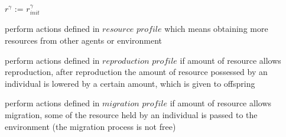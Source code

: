 \begin{algorithmic}

\STATE $r^{\gamma}$ := $r^{\gamma}_{init}$ 


\STATE {} 

  
\STATE perform actions defined in $resource$ $profile$ which means obtaining more resources from other agents or environment

\ELSE
                \STATE perform actions defined in $reproduction$ $profile$ if amount of resource allows reproduction, 
			after reproduction the amount of resource possessed by an individual is lowered by a certain amount, which is given to offspring
        \ENDIF

\ELSE 
                \STATE perform actions defined in $migration$ $profile$ if amount of resource allows migration, some of the resource held by an individual is
			passed to the environment (the migration process is not free)
        \ENDIF

\ENDIF

\ENDWHILE

\end{algorithmic}


